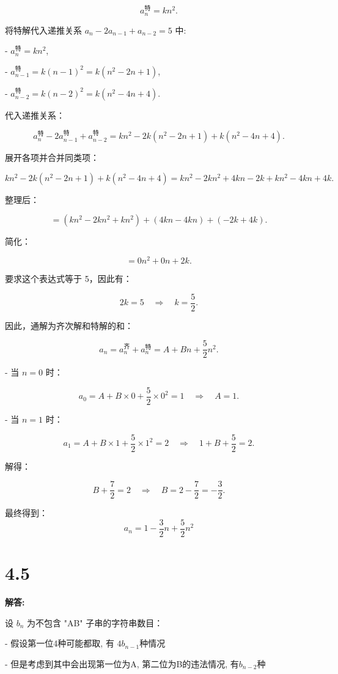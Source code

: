 \documentclass{article}
\begin{document}
\[
a_n^{\text{特}} = k n^2.
\]

将特解代入递推关系 \(a_n - 2a_{n-1} + a_{n-2} = 5\) 中:

- \(a_n^{\text{特}} = k n^2\),

- \(a_{n-1}^{\text{特}} = k (n-1)^2 = k (n^2 - 2n + 1)\),

- \(a_{n-2}^{\text{特}} = k (n-2)^2 = k (n^2 - 4n + 4)\).

代入递推关系：

\[
a_n^{\text{特}} - 2a_{n-1}^{\text{特}} + a_{n-2}^{\text{特}} = k n^2 - 2k (n^2 - 2n + 1) + k (n^2 - 4n + 4).
\]

展开各项并合并同类项：

\[
k n^2 - 2k (n^2 - 2n + 1) + k (n^2 - 4n + 4) = k n^2 - 2k n^2 + 4k n - 2k + k n^2 - 4k n + 4k.
\]

整理后：

\[
= (k n^2 - 2k n^2 + k n^2) + (4k n - 4k n) + (-2k + 4k).
\]

简化：

\[
= 0n^2 + 0n + 2k.
\]

要求这个表达式等于 5，因此有：

\[
2k = 5 \quad \Rightarrow \quad k = \frac{5}{2}.
\]

因此，通解为齐次解和特解的和：

\[
a_n = a_n^{\text{齐}} + a_n^{\text{特}} = A + Bn + \frac{5}{2}n^2.
\]

- 当 \(n = 0\) 时：

\[
a_0 = A + B \times 0 + \frac{5}{2} \times 0^2 = 1 \quad \Rightarrow \quad A = 1.
\]

- 当 \(n = 1\) 时：

\[
a_1 = A + B \times 1 + \frac{5}{2} \times 1^2 = 2 \quad \Rightarrow \quad 1 + B + \frac{5}{2} = 2.
\]

解得：

\[
B + \frac{7}{2} = 2 \quad \Rightarrow \quad B = 2 - \frac{7}{2} = -\frac{3}{2}.
\]

最终得到：
\[
\boxed{
a_n = 1 - \frac{3}{2}n + \frac{5}{2}n^2}
\]

\section*{4.5}
\textbf{解答:}

设 \( b_n \) 为不包含 "AB" 子串的字符串数目：

- 假设第一位4种可能都取, 有 \(4b_{n-1} \)种情况

- 但是考虑到其中会出现第一位为A, 第二位为B的违法情况, 有\(b_{n-2} \)种
\end{document}
